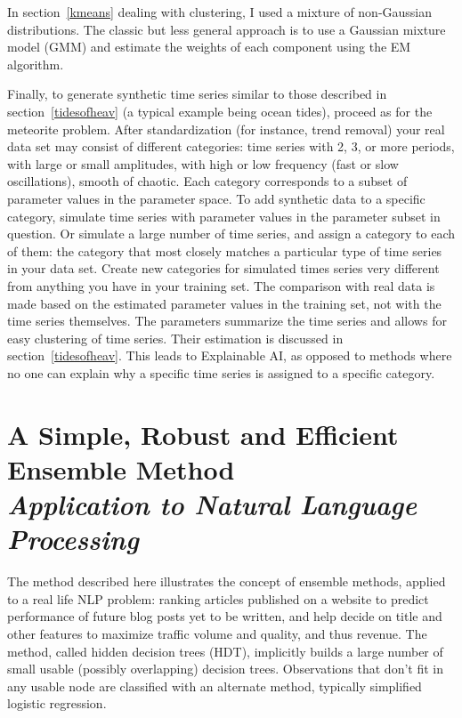 \documentclass[oneside,10pt]{book}
\newcommand\Chapter[2]{
  \chapter[#1]{#1\\[2ex]\Large\itshape#2}
}
\begin{document}
In section~\ref{kmeans} dealing with clustering, I used a mixture of non-Gaussian distributions. The classic but less general approach is to use a
\textcolor{index}{Gaussian mixture model} (GMM) and estimate the weights of each component using the \textcolor{index}{EM algorithm}.

Finally, to generate synthetic time series similar to those described in section~\ref{tidesofheav} (a typical example being ocean tides), proceed as for the meteorite problem. After standardization (for instance, trend removal) your real data set may consist  of different categories: time series with 2, 3, or more periods, with large or small amplitudes, with high or low frequency (fast or slow oscillations),
 smooth of chaotic. Each category corresponds to a subset of parameter values in the parameter space. To add synthetic data to a specific category,
 simulate time series with parameter values in the parameter subset in question. Or simulate a large number of time series, and assign a category to each of them: the category that most closely matches a particular type of time series in your data set. Create new categories for simulated times series very different from anything you have in your training set. The comparison with real data is made based on the estimated parameter values in the training set, not with the time series themselves. The parameters summarize the time series and allows for easy clustering of time series. Their estimation is discussed in section~\ref{tidesofheav}. This leads to \textcolor{index}{Explainable AI}, as opposed to methods where no one can explain why a specific time series is assigned to a specific category.

\Chapter{A Simple, Robust and Efficient Ensemble Method}{Application to Natural Language Processing}\label{piereboul}

The method described here illustrates the concept of \textcolor{index}{ensemble methods}, applied to a real life NLP problem: ranking articles published on a website to
predict performance of future blog posts yet to be written, and help decide on title and other features to maximize traffic volume and quality, and thus revenue.
The method, called hidden decision trees (HDT), implicitly builds a large number of small usable (possibly overlapping)  \textcolor{index}{decision trees}. Observations that
don't fit in any usable node are classified with an alternate method, typically simplified \textcolor{index}{logistic regression}.
\end{document}
